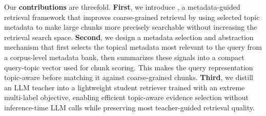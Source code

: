
Our \textbf{contributions} are threefold. \textbf{First}, we introduce \textbf{\name{}}, a metadata-guided retrieval framework that improves coarse-grained retrieval by using selected topic metadata to make large chunks more precisely searchable without increasing the retrieval search space. \textbf{Second}, we design a metadata selection and abstraction mechanism that first selects the topical metadata most relevant to the query from a corpus-level metadata bank, then summarizes these signals into a compact query-topic vector used for chunk scoring. This makes the query representation topic-aware before matching it against coarse-grained chunks. \textbf{Third}, we distill an LLM teacher into a lightweight student retriever trained with an extreme multi-label objective, enabling efficient topic-aware evidence selection without inference-time LLM calls while preserving most teacher-guided retrieval quality.